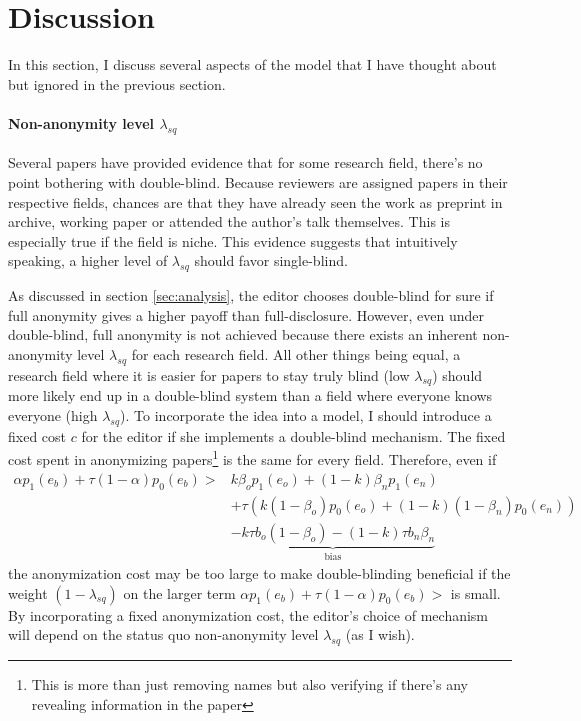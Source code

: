 \documentclass[12pt]{article}
\begin{document}
\section{Discussion}
In this section, I discuss several aspects of the model that I have thought
about but ignored in the previous section.
\paragraph{Non-anonymity level $\lambda_{sq}$} Several papers have provided
evidence that for some research field, there's no point bothering with
double-blind. Because reviewers are assigned papers in their respective fields,
chances are that they have already seen the work as preprint in archive,
working paper or attended the author's talk themselves. This is especially true
if the field is niche. This evidence suggests that intuitively speaking, a
higher level of $\lambda_{sq}$ should favor single-blind.

As discussed in section \ref{sec:analysis}, the editor chooses double-blind for
sure if full anonymity gives a higher payoff than full-disclosure. However,
even under double-blind, full anonymity is not achieved because there exists an
inherent non-anonymity level $\lambda_{sq}$ for each research field. All other
things being equal, a research field where it is easier for papers to stay
truly blind (low $\lambda_{sq}$) should more likely end up in a double-blind
system than a field where everyone knows everyone (high $\lambda_{sq}$). To
incorporate the idea into a model, I should introduce a fixed cost $c$ for the
editor if she implements a double-blind mechanism. The fixed cost spent in
anonymizing papers\footnote{This is more than just removing names but also
    verifying if there's any revealing information in the paper} is the same for
every field. Therefore, even if
\begin{equation*}
    \begin{split}
        \alpha p_1(e_b) + \tau(1-\alpha)p_0(e_b)> &
        k\beta_o p_1(e_o) + (1-k)\beta_n p_1(e_n)   \\ & + \tau(k(1-\beta_o)p_0(e_o) + (1-k)(1-\beta_n)p_0(e_n))\\
                                                  &
        \underbrace{-k\tau b_o(1-\beta_o) - (1-k)\tau b_n\beta_n }_{\text{bias}}
    \end{split}
\end{equation*}
the anonymization cost may be too large to make double-blinding beneficial if the weight $(1-\lambda_{sq})$ on the larger term $\alpha p_1(e_b) + \tau(1-\alpha)p_0(e_b)>$ is small.
By incorporating a fixed anonymization cost, the editor's choice of mechanism will depend on the status quo non-anonymity level $\lambda_{sq}$ (as I wish).
\end{document}

